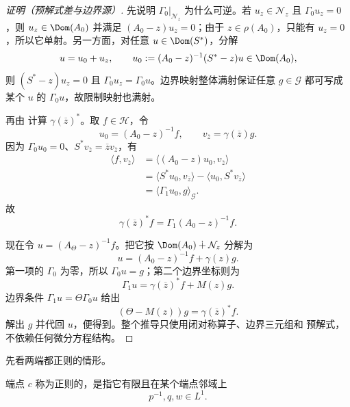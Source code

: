 \begin{proof}[证明（预解式差与边界源）]
先说明 $\Gamma_0|_{\mathcal N_z}$ 为什么可逆。若 $u_z\in\mathcal N_z$ 且 $\Gamma_0u_z=0$，则 $u_z\in\Dom(A_0)$ 并满足 $(A_0-z)u_z=0$；由于 $z\in\rho(A_0)$，只能有 $u_z=0$，所以它单射。另一方面，对任意 $u\in\Dom(S^*)$，分解
\[
 u=u_0+u_z,
 \qquad
 u_0:=(A_0-z)^{-1}(S^*-z)u\in\Dom(A_0),
\]
则 $(S^*-z)u_z=0$ 且 $\Gamma_0u_z=\Gamma_0u$。边界映射整体满射保证任意 $g\in\mathcal G$ 都可写成某个 $u$ 的 $\Gamma_0u$，故限制映射也满射。

再由 计算 $\gamma(\overline z)^*$。取 $f\in\mathcal H$，令
\[
 u_0=(A_0-z)^{-1}f,
 \qquad v_{\overline z}=\gamma(\overline z)g.
\]
因为 $\Gamma_0u_0=0$、$S^*v_{\overline z}=\overline z v_{\overline z}$，有
\[
\begin{aligned}
 \langle f,v_{\overline z}\rangle
 &=\langle(A_0-z)u_0,v_{\overline z}\rangle\\
 &=\langle S^*u_0,v_{\overline z}\rangle
   -\langle u_0,S^*v_{\overline z}\rangle\\
 &=\langle\Gamma_1u_0,g\rangle_{\mathcal G}.
\end{aligned}
\]
故
\begin{equation*}
 \gamma(\overline z)^*f=\Gamma_1(A_0-z)^{-1}f.
\end{equation*}

现在令 $u=(A_\Theta-z)^{-1}f$。把它按 $\Dom(A_0)\dotplus\mathcal N_z$ 分解为
\[
 u=(A_0-z)^{-1}f+\gamma(z)g.
\]
第一项的 $\Gamma_0$ 为零，所以 $\Gamma_0u=g$；第二个边界坐标则为
\[
 \Gamma_1u
 =\gamma(\overline z)^*f+M(z)g.
\]
边界条件 $\Gamma_1u=\Theta\Gamma_0u$ 给出
\[
 (\Theta-M(z))g=\gamma(\overline z)^*f.
\]
解出 $g$ 并代回 $u$，便得到。整个推导只使用闭对称算子、边界三元组和 预解式，不依赖任何微分方程结构。
\end{proof}

先看两端都正则的情形。

\begin{definition}[正则端点]
端点 $c$ 称为正则的，是指它有限且在某个端点邻域上
\[
 p^{-1},q,w\in L^1.
\]
\end{definition}

